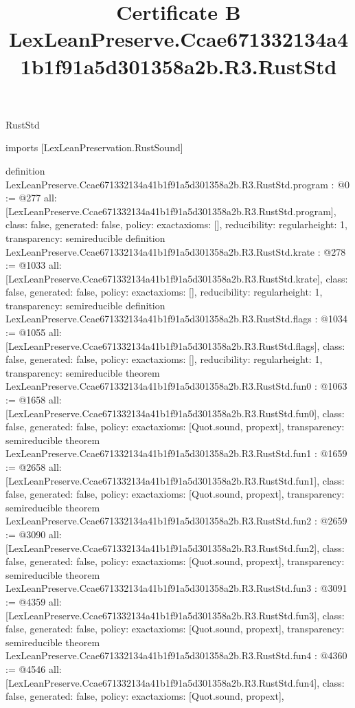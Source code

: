 \begin{lexlean}{RustStd}
\title{Certificate B LexLeanPreserve.Ccae671332134a41b1f91a5d301358a2b.R3.RustStd}
\begin{coremodule}
imports [LexLeanPreservation.RustSound]

definition LexLeanPreserve.Ccae671332134a41b1f91a5d301358a2b.R3.RustStd.program : @0 := @277 {
  all: [LexLeanPreserve.Ccae671332134a41b1f91a5d301358a2b.R3.RustStd.program],
  class: false,
  generated: false,
  policy: exact{axioms: []},
  reducibility: regular{height: 1},
  transparency: semireducible
}
definition LexLeanPreserve.Ccae671332134a41b1f91a5d301358a2b.R3.RustStd.krate : @278 := @1033 {
  all: [LexLeanPreserve.Ccae671332134a41b1f91a5d301358a2b.R3.RustStd.krate],
  class: false,
  generated: false,
  policy: exact{axioms: []},
  reducibility: regular{height: 1},
  transparency: semireducible
}
definition LexLeanPreserve.Ccae671332134a41b1f91a5d301358a2b.R3.RustStd.flags : @1034 := @1055 {
  all: [LexLeanPreserve.Ccae671332134a41b1f91a5d301358a2b.R3.RustStd.flags],
  class: false,
  generated: false,
  policy: exact{axioms: []},
  reducibility: regular{height: 1},
  transparency: semireducible
}
theorem LexLeanPreserve.Ccae671332134a41b1f91a5d301358a2b.R3.RustStd.fun0 : @1063 := @1658 {
  all: [LexLeanPreserve.Ccae671332134a41b1f91a5d301358a2b.R3.RustStd.fun0],
  class: false,
  generated: false,
  policy: exact{axioms: [Quot.sound, propext]},
  transparency: semireducible
}
theorem LexLeanPreserve.Ccae671332134a41b1f91a5d301358a2b.R3.RustStd.fun1 : @1659 := @2658 {
  all: [LexLeanPreserve.Ccae671332134a41b1f91a5d301358a2b.R3.RustStd.fun1],
  class: false,
  generated: false,
  policy: exact{axioms: [Quot.sound, propext]},
  transparency: semireducible
}
theorem LexLeanPreserve.Ccae671332134a41b1f91a5d301358a2b.R3.RustStd.fun2 : @2659 := @3090 {
  all: [LexLeanPreserve.Ccae671332134a41b1f91a5d301358a2b.R3.RustStd.fun2],
  class: false,
  generated: false,
  policy: exact{axioms: [Quot.sound, propext]},
  transparency: semireducible
}
theorem LexLeanPreserve.Ccae671332134a41b1f91a5d301358a2b.R3.RustStd.fun3 : @3091 := @4359 {
  all: [LexLeanPreserve.Ccae671332134a41b1f91a5d301358a2b.R3.RustStd.fun3],
  class: false,
  generated: false,
  policy: exact{axioms: [Quot.sound, propext]},
  transparency: semireducible
}
theorem LexLeanPreserve.Ccae671332134a41b1f91a5d301358a2b.R3.RustStd.fun4 : @4360 := @4546 {
  all: [LexLeanPreserve.Ccae671332134a41b1f91a5d301358a2b.R3.RustStd.fun4],
  class: false,
  generated: false,
  policy: exact{axioms: [Quot.sound, propext]},
}
\end{coremodule}
\end{lexlean}
